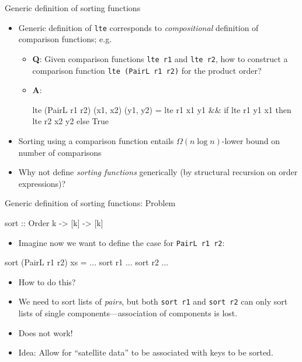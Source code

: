\documentclass{beamer}
\begin{document}
\begin{frame}[fragile]{Generic definition of sorting functions}
  \begin{itemize}
  \item Generic definition of \lstinline|lte| corresponds to \emph{compositional}
    definition of comparison functions; e.g.
    \begin{itemize}
    \item \textbf{Q}: Given comparison functions \lstinline|lte r1| and
      \lstinline|lte r2|, how to construct a comparison function
      \lstinline|lte (PairL r1 r2)| for the product order?
    \item \textbf{A}:
\begin{haskell}
lte (PairL r1 r2) (x1, x2) (y1, y2) =
     lte r1 x1 y1 &&
     if lte r1 y1 x1 then lte r2 x2 y2 else True
\end{haskell}
    \end{itemize}
  \item Sorting using a comparison function entails $\Omega(n \log n)$-lower
    bound on number of comparisons
  \item Why not define \emph{sorting functions} generically (by structural
    recursion on order expressions)?
  \end{itemize}
\end{frame}

\begin{frame}[fragile]{Generic definition of sorting functions: Problem}
\begin{haskell}
sort :: Order k -> [k] -> [k]
\end{haskell}
  \begin{itemize}
  \item Imagine now we want to define the case for \lstinline|PairL r1 r2|:
  \end{itemize}
\begin{haskell}
sort (PairL r1 r2) xs =
   ... sort r1 ... sort r2 ...
\end{haskell}
  \begin{itemize}
  \item How to do this?
  \item We need to sort lists of \emph{pairs}, but both \lstinline|sort r1| and
    \lstinline|sort r2| can only sort lists of single components---association of
    components is lost.
  \item Does not work!
  \item Idea: Allow for ``satellite data'' to be associated with keys to be
    sorted.
  \end{itemize}
\end{frame}
\end{document}
